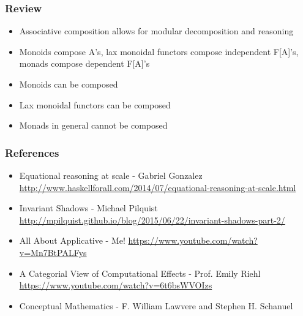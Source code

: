 \documentclass{beamer}
\begin{document}
\begin{frame}

  \frametitle{Review}
  \large

  \begin{itemize}
    \item Associative composition allows for modular decomposition and reasoning \pause
    \item Monoids compose A's, lax monoidal functors compose independent F[A]'s, monads compose dependent F[A]'s \pause
    \item Monoids can be composed \pause
    \item Lax monoidal functors can be composed \pause
    \item Monads in general cannot be composed
  \end{itemize}

\end{frame}

\begin{frame}

  \frametitle{References}

  \begin{itemize}
    \item Equational reasoning at scale - Gabriel Gonzalez
      \url{http://www.haskellforall.com/2014/07/equational-reasoning-at-scale.html}
    \item Invariant Shadows - Michael Pilquist
      \url{http://mpilquist.github.io/blog/2015/06/22/invariant-shadows-part-2/}
    \item All About Applicative - Me!
      \url{https://www.youtube.com/watch?v=Mn7BtPALFys}
    \item A Categorial View of Computational Effects - Prof. Emily Riehl
      \url{https://www.youtube.com/watch?v=6t6bsWVOIzs}
    \item Conceptual Mathematics - F. William Lawvere and Stephen H. Schanuel
  \end{itemize}

\end{frame}
\end{document}
